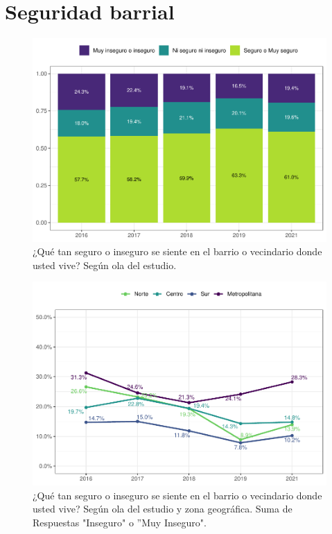 \documentclass[
  12pt,
]{book}
\begin{document}
\hypertarget{seguridad-barrial}{%
\section{Seguridad barrial}\label{seguridad-barrial}}

\begin{figure}

{\centering \includegraphics{reporte-elsoc_files/figure-latex/seguri-ola-1} 

}

\caption{¿Qué tan seguro o inseguro se siente en el barrio o vecindario donde usted vive? Según ola del estudio.}\label{fig:seguri-ola}
\end{figure}

\begin{figure}

{\centering \includegraphics{reporte-elsoc_files/figure-latex/seguri-zona-1} 

}

\caption{¿Qué tan seguro o inseguro se siente en el barrio o vecindario donde usted vive? Según ola del estudio y zona geográfica. Suma de Respuestas "Inseguro" o ”Muy Inseguro".}\label{fig:seguri-zona}
\end{figure}
\end{document}
